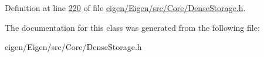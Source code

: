 Definition at line \hyperlink{eigen_2_eigen_2src_2_core_2_dense_storage_8h_source_l00220}{220} of file \hyperlink{eigen_2_eigen_2src_2_core_2_dense_storage_8h_source}{eigen/\+Eigen/src/\+Core/\+Dense\+Storage.\+h}.



The documentation for this class was generated from the following file\+:\begin{DoxyCompactItemize}
\item 
eigen/\+Eigen/src/\+Core/\+Dense\+Storage.\+h\end{DoxyCompactItemize}
